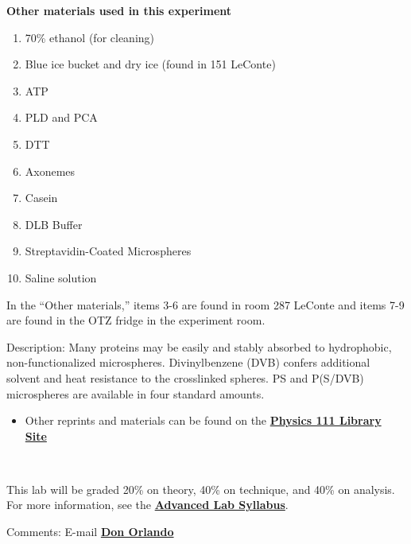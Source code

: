 \documentclass{../lab}
\begin{document}
\textbf{Other materials used in this experiment}

\begin{enumerate}
    \item 70\% ethanol (for cleaning)

    \item Blue ice bucket and dry ice (found in 151 LeConte)

    \item ATP

    \item PLD and PCA

    \item DTT

    \item Axonemes

    \item Casein

    \item DLB Buffer

    \item Streptavidin-Coated Microspheres

    \item Saline solution

\end{enumerate}

In the ``Other materials,'' items 3-6 are found in room 287 LeConte and items 7-9 are found in the OTZ fridge in the experiment room.

Description: Many proteins may be easily and stably absorbed to hydrophobic, non-functionalized microspheres. Divinylbenzene (DVB) confers additional solvent and heat resistance to the crosslinked spheres. PS and P(S/DVB) microspheres are available in four standard amounts.

\begin{itemize}
    \item Other reprints and materials can be found on the \href{http://physics111.lib.berkeley.edu/Physics111/Reprints/OTZ/OTZ\_index.html}{\textbf{Physics 111 Library Site}}

\end{itemize}

\textbf{​}

This lab will be graded 20\% on theory, 40\% on technique, and 40\% on analysis. For more information, see the \href{http://experimentationlab.berkeley.edu/syllabus}{\textbf{Advanced Lab Syllabus}}.

Comments: E-mail \href{\MailDonOrlando}{\textbf{Don Orlando}}
\end{document}
